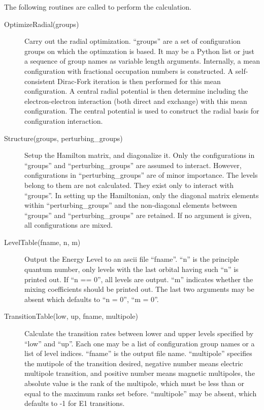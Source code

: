 \documentclass[12pt]{article}
\begin{document}
The following routines are called to perform the calculation.
\begin{description}
\item[OptimizeRadial(groups)] 
Carry out the radial optimization. ``groups'' are a set of configuration
groups on which the optimzation is based. It may be a Python list or just a
sequence of group names as variable length arguments. Internally, a mean
configuration with fractional 
occupation numbers is constructed. A self-consistent Dirac-Fork iteration
is then performed for this mean configuration. A central radial potential is
then determine including the electron-electron interaction (both direct and
exchange) with this mean configuration. The central potential is used to
construct the radial basis for configuration interaction. 

\item[Structure(groups, perturbing\_groups)] 
Setup the Hamilton matrix, and diagonalize
it. Only the configurations in ``groups'' and ``perturbing\_groups'' are
assumed to interact. However, configurations in ``perturbing\_groups'' are of
minor importance. The levels belong to them are not calculated. They exist
only to interact with ``groups''. In setting up the Hamiltonian, only the
diagonal matrix elements within ``perturbing\_groups'' and the non-diagonal
elements between ``groups'' and ``perturbing\_groups'' are retained. If no
argument is given, all configurations are mixed.  

\item[LevelTable(fname, n, m)] 
Output the Energy Level to an ascii file ``fname''. ``n'' is the principle
quantum number, only levels with the last orbital having such ``n'' is printed
out. If ``n == 0'', all levels are output. ``m'' indicates whether the mixing
coefficients should be printed out. The last two arguments may be absent which
defaults to ``n = 0'', ``m = 0''.

\item[TransitionTable(low, up, fname, multipole)] 
Calculate the transition rates between lower and upper levels specified by
``low'' and ``up''. Each one may be a list of configuration group names or a
list of level indices. ``fname'' is the output file name. ``multipole''
specifies the mutipole of the transition desired, negative number means
electric multipole transition, and positive number means magnetic multipoles,
the absolute value is the rank of the multipole, which must be less than or
equal to the maximum ranks set before. ``multipole'' may be absent, which
defaults to -1 for E1 transitions.
\end{description}
\end{document}
